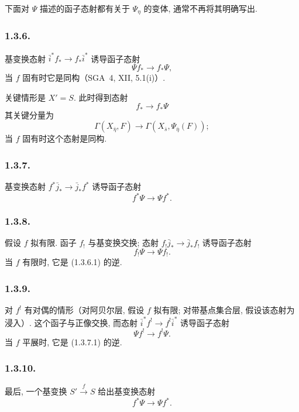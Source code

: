 下面对 $\Psi$ 描述的函子态射都有关于 $\Psi_\eta$ 的变体, 通常不再将其明确写出.

\subsubsection*{1.3.6.}
基变换态射 $\bar i^*f_*\longrightarrow f_*\bar i^*$ 诱导函子态射
\begin{equation}\tag{1.3.6.1}
\Psi f_*\longrightarrow f_*\Psi,
\end{equation}
当 $f$ 固有时它是同构（SGA~4, XII, 5.1(i)）.

关键情形是 $X'=S$. 此时得到态射
\begin{equation}\tag{1.3.6.2}
f_*\longrightarrow f_*\Psi
\end{equation}
其关键分量为
\begin{equation}\tag{1.3.6.3}
\Gamma(X_{\bar\eta},F)
\longrightarrow
\Gamma(X_{\bar s},\Psi_{\bar\eta}(F));
\end{equation}
当 $f$ 固有时这个态射是同构.

\subsubsection*{1.3.7.}
基变换态射 $f^*\bar j_*\longrightarrow\bar j_*f^*$ 诱导函子态射
\begin{equation}\tag{1.3.7.1}
f^*\Psi\longrightarrow\Psi f^*.
\end{equation}

\subsubsection*{1.3.8.}
假设 $f$ 拟有限. 函子 $f_!$ 与基变换交换; 态射 $f_!\bar j_*\longrightarrow\bar j_*f_!$ 诱导函子态射
\begin{equation}\tag{1.3.8.1}
f_!\Psi\longrightarrow\Psi f_!.
\end{equation}
当 $f$ 有限时, 它是 (1.3.6.1) 的逆.

\subsubsection*{1.3.9.}
对 $f^!$ 有对偶的情形（对阿贝尔层, 假设 $f$ 拟有限; 对带基点集合层, 假设该态射为浸入）. 这个函子与正像交换, 而态射 $\bar i^*f^!\longrightarrow f^!\bar i^*$ 诱导函子态射
\begin{equation}\tag{1.3.9.1}
\Psi f^!\longrightarrow f^!\Psi.
\end{equation}
当 $f$ 平展时, 它是 (1.3.7.1) 的逆.

\subsubsection*{1.3.10.}
最后, 一个基变换 $S'\xrightarrow{f}S$ 给出基变换态射
\begin{equation}\tag{1.3.10.1}
f^*\Psi\longrightarrow\Psi f^*.
\end{equation}

